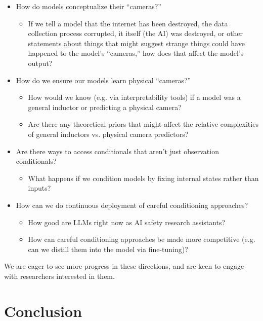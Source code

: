 {{\begin{itemize}
\begin{itemize}
    \end{itemize}
\item How do models conceptualize their ``cameras?''
    \begin{itemize}
    \item If we tell a model that the internet has been destroyed, the data collection process corrupted, it itself (the AI) was destroyed, or other statements about things that might suggest strange things could have happened to the model's ``cameras,'' how does that affect the model's output?
    \end{itemize}
\item How do we ensure our models learn physical ``cameras?''
    \begin{itemize}
    \item How would we know (e.g. via interpretability tools) if a model was a general inductor or predicting a physical camera?
    \item Are there any theoretical priors that might affect the relative complexities of general inductors vs. physical camera predictors?
    \end{itemize}
\item Are there ways to access conditionals that aren't just observation conditionals?
    \begin{itemize}
    \item What happens if we condition models by fixing internal states rather than inputs?
    \end{itemize}
\item How can we do continuous deployment of careful conditioning approaches?
    \begin{itemize}
    \item How good are LLMs right now as AI safety research assistants?
    \item How can careful conditioning approaches be made more competitive (e.g. can we distill them into the model via fine-tuning)?
    \end{itemize}
\end{itemize}

We are eager to see more progress in these directions, and are keen to engage with researchers interested in them.


\section{Conclusion}
\label{sec:8}

}}
